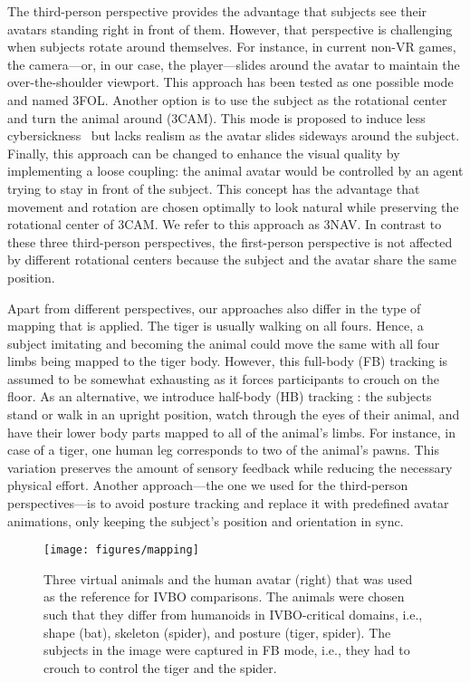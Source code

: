 The third-person perspective provides the advantage that subjects see their avatars standing right in front of them. However, that perspective is challenging when subjects rotate around themselves. For instance, in current non-VR games, the camera---or, in our case, the player---slides around the avatar to maintain the over-the-shoulder viewport.  This approach has been tested as one possible mode and named 3FOL. Another option is to use the subject as the rotational center and turn the animal around (3CAM). This mode is proposed to induce less cybersickness~\cite{laviola2000discussion} but lacks realism as the avatar slides sideways around the subject. Finally, this approach can be changed to enhance the visual quality by implementing a loose coupling: the animal avatar would be controlled by an agent trying to stay in front of the subject. This concept has the advantage that movement and rotation are chosen optimally to look natural while preserving the rotational center of 3CAM. We refer to this approach as 3NAV. In contrast to these three third-person perspectives, the first-person perspective is not affected by different rotational centers because the subject and the avatar share the same position.


Apart from different perspectives, our approaches also differ in the type of mapping that is applied. The tiger is usually walking on all fours. Hence, a subject imitating and becoming the animal could move the same with all four limbs being mapped to the tiger body. However, this full-body (FB) tracking is assumed to be somewhat exhausting as it forces participants to crouch on the floor. As an alternative, we introduce half-body (HB) tracking : the subjects stand or walk in an upright position, watch through the eyes of their animal, and have their lower body parts mapped to all of the animal’s limbs. For instance, in case of a tiger, one human leg corresponds to two of the animal's pawns. This variation preserves the amount of sensory feedback while reducing the necessary physical effort. Another approach---the one we used for the third-person perspectives---is to avoid posture tracking and replace it with predefined avatar animations, only keeping the subject's position and orientation in sync.





\begin{figure*}[t!]
\centering
\texttt{[image: figures/mapping]}
\caption{Three virtual animals and the human avatar (right) that was used as the reference for IVBO comparisons. The animals were chosen such that they differ from humanoids in IVBO-critical domains, i.e., shape (bat), skeleton (spider), and posture (tiger, spider). The subjects in the image were captured in FB mode, i.e., they had to crouch to control the tiger and the spider.}
\label{fig:mapping}
\end{figure*}


